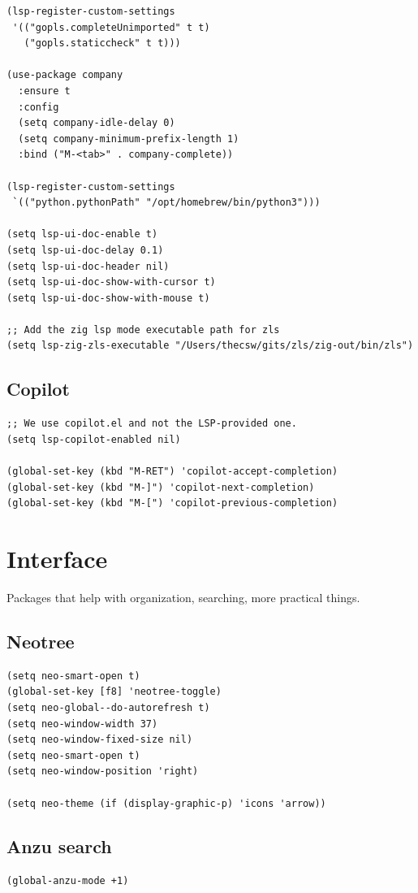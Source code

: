 \documentclass[10pt]{article}
\begin{document}
\begin{verbatim}
(lsp-register-custom-settings
 '(("gopls.completeUnimported" t t)
   ("gopls.staticcheck" t t)))

(use-package company
  :ensure t
  :config
  (setq company-idle-delay 0)
  (setq company-minimum-prefix-length 1)
  :bind ("M-<tab>" . company-complete))

(lsp-register-custom-settings
 `(("python.pythonPath" "/opt/homebrew/bin/python3")))

(setq lsp-ui-doc-enable t)
(setq lsp-ui-doc-delay 0.1)
(setq lsp-ui-doc-header nil)
(setq lsp-ui-doc-show-with-cursor t)
(setq lsp-ui-doc-show-with-mouse t)

;; Add the zig lsp mode executable path for zls
(setq lsp-zig-zls-executable "/Users/thecsw/gits/zls/zig-out/bin/zls")
\end{verbatim}
\subsection{Copilot}
\label{sec:org4863759}
\begin{verbatim}
;; We use copilot.el and not the LSP-provided one.
(setq lsp-copilot-enabled nil)

(global-set-key (kbd "M-RET") 'copilot-accept-completion)
(global-set-key (kbd "M-]") 'copilot-next-completion)
(global-set-key (kbd "M-[") 'copilot-previous-completion)
\end{verbatim}
\section{Interface}
\label{sec:org20deecc}

Packages that help with organization, searching, more practical things.
\subsection{Neotree}
\label{sec:org96d5eb1}
\begin{verbatim}
(setq neo-smart-open t)
(global-set-key [f8] 'neotree-toggle)
(setq neo-global--do-autorefresh t)
(setq neo-window-width 37)
(setq neo-window-fixed-size nil)
(setq neo-smart-open t)
(setq neo-window-position 'right)

(setq neo-theme (if (display-graphic-p) 'icons 'arrow))
\end{verbatim}
\subsection{Anzu search}
\label{sec:org750382c}
\begin{verbatim}
(global-anzu-mode +1)
\end{verbatim}
\end{document}
